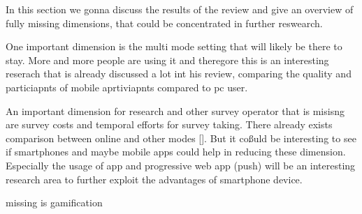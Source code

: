 In this section we gonna discuss the results of the review and give an overview of fully missing dimensions, that could be concentrated in further reswearch.

One important dimension is the  multi mode setting that will likely be there to stay. More and more people are using it and theregore this is an interesting reserach that is already discussed a lot int his review, comparing the quality and particiapnts of mobile aprtiviapnts compared to pc user.

An important dimension for research and other survey operator that is misisng are survey costs and temporal efforts for survey taking. There already exists comparison between online and other modes []. But it coßuld be interesting to see if smartphones and maybe mobile apps could help in reducing these dimension. Especially the usage of app and progressive web app (push) will be an interesting research area to further exploit the advantages of smartphone device. 

missing is gamification